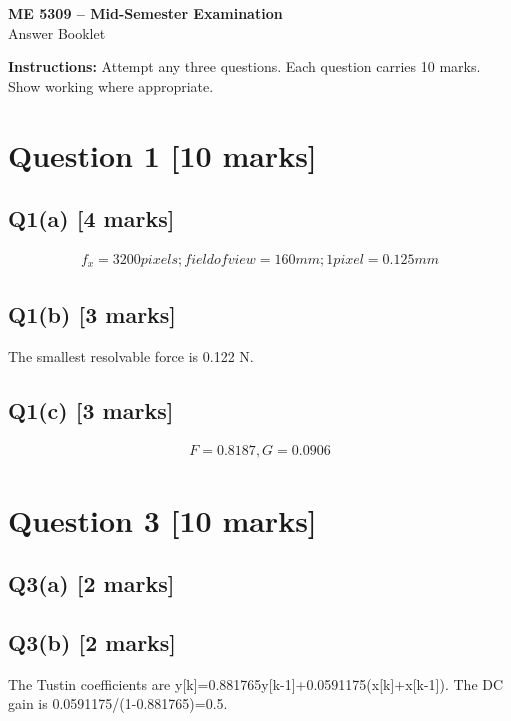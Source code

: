 \documentclass[11pt,a4paper]{article}
\begin{document}
\begin{center}
{\Large\bfseries ME 5309 -- Mid-Semester Examination}\\[3pt]
{\large Answer Booklet}\\[8pt]
\end{center}
\textbf{Instructions:} Attempt any three questions. Each question carries 10 marks. Show working where appropriate.
\section*{Question 1 \hfill [10 marks]}
\subsection*{Q1(a) \hfill [4 marks]}

\[\begin{aligned}f_x = 3200 pixels; field of view = 160 mm; 1 pixel = 0.125 mm\end{aligned}\]

\subsection*{Q1(b) \hfill [3 marks]}

The smallest resolvable force is 0.122 N.

\subsection*{Q1(c) \hfill [3 marks]}

\[\begin{aligned}F = 0.8187, G = 0.0906\end{aligned}\]

\section*{Question 3 \hfill [10 marks]}
\subsection*{Q3(a) \hfill [2 marks]}

\vspace{2mm}

\subsection*{Q3(b) \hfill [2 marks]}

The Tustin coefficients are y[k]=0.881765y[k-1]+0.0591175(x[k]+x[k-1]).
The DC gain is 0.0591175/(1-0.881765)=0.5.
\end{document}
